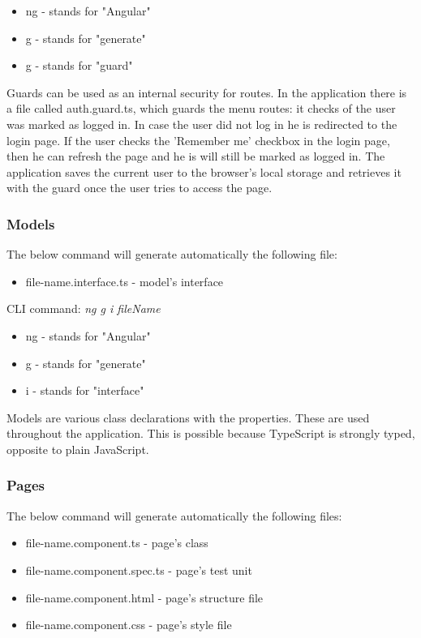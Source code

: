 \begin{itemize}
	\item ng - stands for "Angular"
	\item g - stands for "generate"
	\item g - stands for "guard"
\end{itemize}


Guards can be used as an internal security for routes. In the application there is a file called auth.guard.ts, which guards the menu routes: it checks of the user was marked as logged in. In case the user did not log in he is redirected to the login page. If the user checks the 'Remember me' checkbox in the login page, then he can refresh the page and he is will still be marked as logged in. The application saves the current user to the browser's local storage and retrieves it with the guard once the user tries to access the page.

\subsubsection{Models}
\label{chap:04:01:02:03}

The below command will generate automatically the following file:

\begin{itemize}
	\item file-name.interface.ts - model's interface
\end{itemize}

CLI command: \textit{ng g i fileName}

\begin{itemize}
	\item ng - stands for "Angular"
	\item g - stands for "generate"
	\item i - stands for "interface"
\end{itemize}


Models are various class declarations with the properties. These are used throughout the application. This is possible because TypeScript is strongly typed, opposite to plain JavaScript.

\subsubsection{Pages}
\label{chap:04:01:02:04}

The below command will generate automatically the following files:

\begin{itemize}
	\item file-name.component.ts - page's class
	\item file-name.component.spec.ts - page's test unit
	\item file-name.component.html - page's structure file
	\item file-name.component.css - page's style file
\end{itemize}

